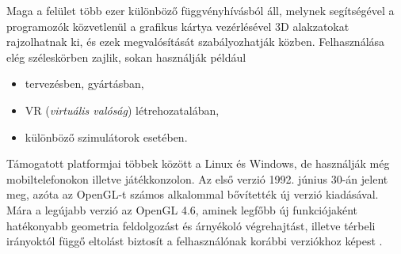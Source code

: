 Maga a felület több ezer különböző függvényhívásból áll, melynek segítségével a programozók közvetlenül a grafikus kártya vezérlésével 3D alakzatokat rajzolhatnak ki, és ezek megvalósítását szabályozhatják közben. Felhasználása elég széleskörben zajlik, sokan használják például
\begin{itemize}
\item tervezésben, gyártásban, 
\item VR (\textit{virtuális valóság}) létrehozatalában,
\item különböző szimulátorok esetében.
\end{itemize}

Támogatott platformjai többek között a Linux és Windows, de használják még mobiltelefonokon illetve játékkonzolon.
Az első verzió 1992. június 30-án jelent meg, azóta az OpenGL-t számos alkalommal bővítették új verzió kiadásával.
Mára a legújabb verzió az OpenGL 4.6, aminek legfőbb új funkciójaként  hatékonyabb geometria feldolgozást és árnyékoló végrehajtást, illetve térbeli irányoktól függő eltolást biztosít a felhasználónak korábbi verziókhoz képest \cite{khronos1997opengl}.
